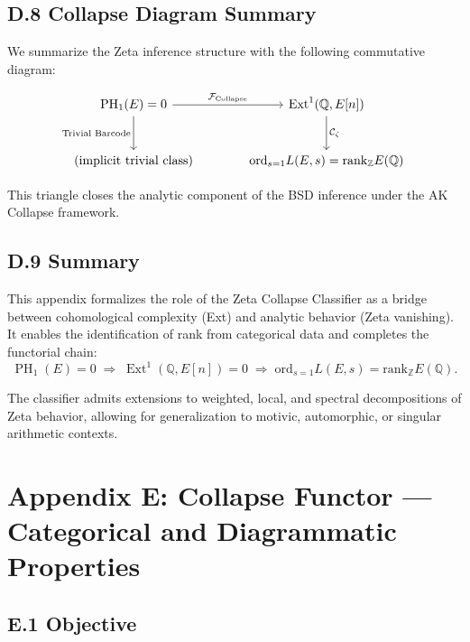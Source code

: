 \documentclass[11pt]{article}
\DeclareMathOperator{\Ext}{Ext}
\DeclareMathOperator{\PH}{PH}
\newcommand{\QQ}{\mathbb{Q}}
\newcommand{\ZZ}{\mathbb{Z}}
\begin{document}
\subsection*{D.8 Collapse Diagram Summary}

We summarize the Zeta inference structure with the following commutative diagram:

\[
\begin{tikzcd}[row sep=large, column sep=large]
\PH_1(E) = 0
  \arrow[r, "\mathcal{F}_{\mathrm{Collapse}}"]
  \arrow[d, "\text{Trivial Barcode}"']
& \Ext^1(\QQ,E[n])
  \arrow[d, "\mathcal{C}_\zeta"] \\
\text{(implicit trivial class)}
  \arrow[r, phantom, ""]
& \mathrm{ord}_{s=1} L(E,s) = \mathrm{rank}_{\ZZ} E(\QQ)
\end{tikzcd}
\]

This triangle closes the analytic component of the BSD inference under the AK Collapse framework.

\subsection*{D.9 Summary}

This appendix formalizes the role of the Zeta Collapse Classifier as a bridge between cohomological complexity (Ext) and analytic behavior (Zeta vanishing).  
It enables the identification of rank from categorical data and completes the functorial chain:
\[
\PH_1(E) = 0 \;\Rightarrow\; \Ext^1(\QQ,E[n]) = 0 \;\Rightarrow\; \mathrm{ord}_{s=1} L(E,s) = \mathrm{rank}_{\ZZ} E(\QQ).
\]

The classifier admits extensions to weighted, local, and spectral decompositions of Zeta behavior, allowing for generalization to motivic, automorphic, or singular arithmetic contexts.




\section*{Appendix E: Collapse Functor — Categorical and Diagrammatic Properties}

\subsection*{E.1 Objective}
\end{document}
